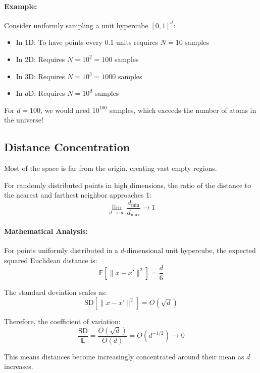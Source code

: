 \documentclass{tufte-handout}
\begin{document}
\paragraph{Example:} Consider uniformly sampling a unit hypercube $[0,1]^d$:
\begin{itemize}
    \item In 1D: To have points every 0.1 units requires $N = 10$ samples
    \item In 2D: Requires $N = 10^2 = 100$ samples
    \item In 3D: Requires $N = 10^3 = 1000$ samples
    \item In $d$D: Requires $N = 10^d$ samples
\end{itemize}

For $d = 100$, we would need $10^{100}$ samples, which exceeds the number of atoms in the universe!


\subsection{Distance Concentration}

Most of the space is far from the origin, creating vast empty regions.


For randomly distributed points in high dimensions, the ratio of the distance to the nearest and farthest neighbor approaches 1:
\begin{equation}
\lim_{d \to \infty} \frac{d_{\min}}{d_{\max}} \to 1
\end{equation}


\paragraph{Mathematical Analysis:}
For points uniformly distributed in a $d$-dimensional unit hypercube, the expected squared Euclidean distance is:
\begin{equation}
\mathbb{E}[\|x - x'\|^2] = \frac{d}{6}
\end{equation}

The standard deviation scales as:
\begin{equation}
\text{SD}[\|x - x'\|^2] = O(\sqrt{d})
\end{equation}

Therefore, the coefficient of variation:
\begin{equation}
\frac{\text{SD}}{\mathbb{E}} = \frac{O(\sqrt{d})}{O(d)} = O(d^{-1/2}) \to 0
\end{equation}

This means distances become increasingly concentrated around their mean as $d$ increases.
\end{document}
